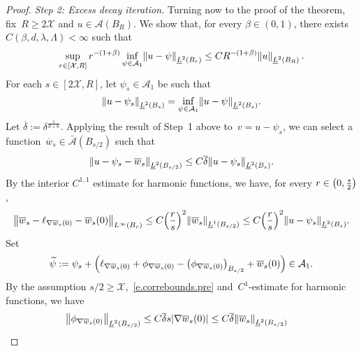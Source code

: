 \documentclass[11pt]{article} %
\numberwithin{equation}{section}
\theoremstyle{definition}
\let\originalleft\left
\let\originalright\right
\renewcommand{\left}{\mathopen{}\mathclose\bgroup\originalleft}
\renewcommand{\right}{\aftergroup\egroup\originalright}
\renewcommand*{\tilde}{\widetilde}
\newcommand{\X}{\mathcal{X}}
\newcommand{\A}{\mathcal{A}}
\newcommand{\Ahom}{\bar{\A}}
\begin{document}
\begin{proof}
\emph{Step 2: Excess decay iteration.}
Turning now to the proof of the theorem, fix~$R \geq 2\X$ and $u\in \mathcal{A}(B_R)$. We show that, for every $\beta\in (0,1)$, there exists $C(\beta,d,\lambda,\Lambda)<\infty$ such that 
\begin{equation}
\label{e.excessdecaygiveth}
\sup_{r \in [\X,R]}
r^{-(1+\beta)} \inf_{\psi \in \A_1}\left\| u - \psi \right\|_{\underline{L}^2(B_{r})}
\leq 
C R^{-(1+\beta)} \left\| u \right\|_{\underline{L}^2(B_{R})}\,.
\end{equation}
For each $s\in [2\X,R]$, let $\psi_s\in \A_1$ be such that
\begin{equation*}
\left\| u - \psi_s  \right\|_{\underline{L}^2(B_s)} 
=
\inf_{\psi\in \A_1} \left\| u - \psi \right\|_{\underline{L}^2(B_s)} .
\end{equation*}
Let $\overline{\delta}:= \delta^{\frac1{d+6}}$.  Applying the result of Step~1 above to~$v = u - \psi_s$, 
we can select a function~$\overline{w}_s \in \Ahom(B_{s/2})$ such that 
\begin{equation*}
\left\| u - \psi_s - \overline{w}_s \right\|_{\underline{L}^2(B_{s/2})}
\leq 
C\overline{\delta} \left\| u - \psi_s \right\|_{\underline{L}^2(B_{s})}.
\end{equation*}
By the interior $C^{1,1}$ estimate for harmonic functions, we have, for every $r\in \left(0,\tfrac s2\right)$,
\begin{equation*}
\left\| \overline{w}_s - \ell_{\nabla \overline{w}_s(0)} -  \overline{w}_s(0) \right\|_{L^\infty(B_r)} 
\leq 
C \left( \frac rs \right)^2 \left\| \overline{w}_s \right\|_{\underline{L}^1(B_{s/2})} 
\leq 
C \left( \frac rs \right)^2
\left\| u - \psi_s \right\|_{\underline{L}^2(B_{s})}.
\end{equation*}
Set
\begin{equation*}
\tilde{\psi}:= \psi_s + \left( \ell_{\nabla \overline{w}_s(0)} + \phi_{\nabla \overline{w}_s(0)} - \left( \phi_{\nabla \overline{w}_s(0)} \right)_{B_{s/2}} 
+ \overline{w}_s(0) \right) \in \A_1.
\end{equation*}
By the assumption $s/2 \geq \X$,~\eqref{e.correbounds.pre} and~$C^1$-estimate for harmonic functions, we have  
\begin{align*}
\bigl\| \phi_{\nabla \overline{w}_s(0)} %
\bigr\|_{\underline{L}^2(B_{s/2})}
\leq C\overline{\delta} s \left| \nabla \overline{w}_s(0) \right| 
&
\leq C\overline{\delta} \left\| \overline{w}_s \right\|_{\underline{L}^2(B_{s/2})} 

\end{align*}
\end{proof}
\end{document}
